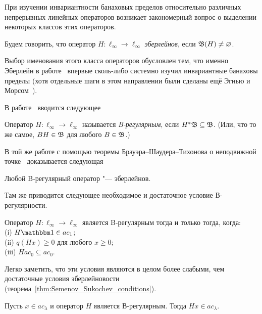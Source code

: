 При изучении инвариантности банаховых пределов относительно различных непрерывных линейных операторов
возникает закономерный вопрос о выделении некоторых классов этих операторов.

\begin{definition}
	Будем говорить, что оператор $H : \ell_\infty \to \ell_\infty$ \emph{эберлейнов},
	если $\mathfrak{B} (H) \ne \varnothing$.
\end{definition}

Выбор именования этого класса операторов обусловлен тем, что именно Эберлейн в работе~\cite{Eberlein}
впервые сколь-либо системно изучил инвариантные банаховы пределы
(хотя отдельные шаги в этом направлении были сделаны ещё Эгнью и Морсом~\cite{agnew1938linear,agnew1938extensions}).

В работе~\cite{alekhno2018invariant} вводится следующее

\begin{definition}
	\label{def:B-regular_operator}
	Оператор $H : \ell_\infty \to \ell_\infty$ называется \emph{B-регулярным},
	если $H^*\mathfrak{B} \subseteq \mathfrak{B}$.
	(Или, что то же самое, $BH\in\mathfrak{B}$ для любого $B\in\mathfrak{B}$.)
\end{definition}

В той же работе с помощью теоремы Брауэра--Шаудера--Тихонова о неподвижной точке~\cite[Corollary  17.56]{aliprantis2006infinite}
доказывается следующая
\begin{theorem}
	\label{thm:B-regular_is_Eberlein}
	Любой B-регулярный оператор "--- эберлейнов.
\end{theorem}
Там же приводится следующее необходимое и достаточное условие В-регулярности.

\begin{theorem}
	\label{thm:crit_B_regularity}
	Оператор $H:\ell_\infty \to \ell_\infty$ является B-регулярным тогда и только тогда, когда:
	\\(i) $H\one \in ac_1$;
	\\(ii) $q(Hx)\geq 0$ для любого $x\geq 0$;
	\\(iii) $H ac_0 \subseteq ac_0$.
\end{theorem}
Легко заметить, что эти условия являются в целом более слабыми, чем достаточные условия эберлейновости
(теорема~\ref{thm:Semenov_Sukochev_conditions}).

\begin{corollary}
	Пусть $x\in ac_\lambda$ и оператор $H$ является В-регулярным.
	Тогда $Hx \in ac_\lambda$.
\end{corollary}

